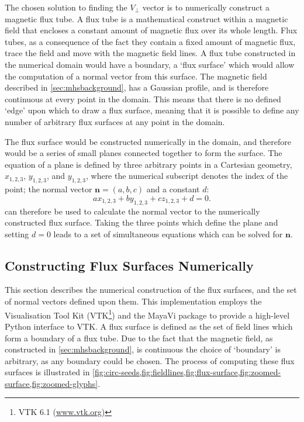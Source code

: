 \documentclass[a4paper,12pt,fourier,authoryear,custommargin]{Classes/PhDThesisPSnPDF}
\renewcommand{\vec}{\mathbf}
\begin{document}
The chosen solution to finding the $V_\perp$ vector is to numerically construct a magnetic flux tube.
A flux tube is a mathematical construct within a magnetic field that encloses a constant amount of magnetic flux over its whole length.
Flux tubes, as a consequence of the fact they contain a fixed amount of magnetic flux, trace the field and move with the magnetic field lines.
A flux tube constructed in the numerical domain would have a boundary, a `flux surface' which would allow the computation of a normal vector from this surface.
The magnetic field described in \cref{sec:mhsbackground}, has a Gaussian profile, and is therefore continuous at every point in the domain.
This means that there is no defined `edge' upon which to draw a flux surface, meaning that it is possible to define any number of arbitrary flux surfaces at any point in the domain.



The flux surface would be constructed numerically in the domain, and therefore would be a series of small planes connected together to form the surface.
The equation of a plane is defined by three arbitrary points in a Cartesian geometry, $x_{1,2,3}$, $y_{1,2,3}$, and $y_{1,2,3}$, where the numerical subscript denotes the index of the point; the normal vector $\vec{n}=(a,b,c)$ and a constant $d$:
\begin{equation}
	ax_{1,2,3}+by_{1,2,3}+cz_{1,2,3}+d=0.
    \label{eq:plane}
\end{equation}
 can therefore be used to calculate the normal vector to the numerically constructed flux surface.
Taking the three points which define the plane and setting $d=0$ leads to a set of simultaneous equations which can be solved for $\vec{n}$.

\subsection{Constructing Flux Surfaces Numerically}

This section describes the numerical construction of the flux surfaces, and the set of normal vectors defined upon them.
This implementation employs the Visualisation Tool Kit (VTK\footnote{VTK 6.1 (\url{www.vtk.org})}) and the MayaVi package \citep{ramachandran2011} to provide a high-level Python interface to VTK.
A flux surface is defined as the set of field lines which form a boundary of a flux tube.
Due to the fact that the magnetic field, as constructed in \cref{sec:mhsbackground}, is continuous the choice of `boundary' is arbitrary, as any boundary could be chosen.
The process of computing these flux surfaces is illustrated in \cref{fig:circ-seeds,fig:fieldlines,fig:flux-surface,fig:zoomed-surface,fig:zoomed-glyphs}.
\end{document}
